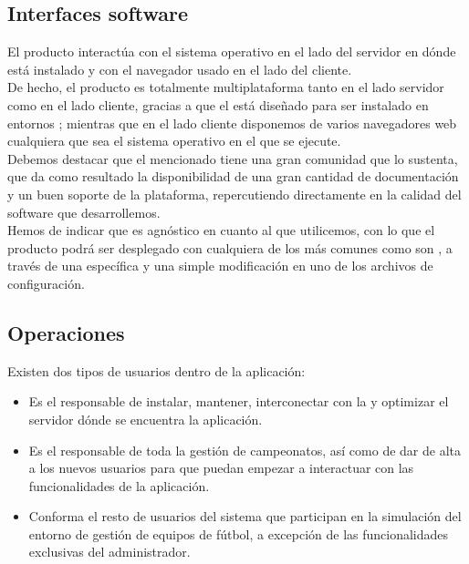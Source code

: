 \subsection{Interfaces software}
El producto interactúa con el sistema operativo en el lado del
servidor en dónde está instalado y con el navegador usado en el lado
del cliente.\\

De hecho, el producto es totalmente multiplataforma tanto en el lado
servidor como en el lado cliente, gracias a que el  está diseñado para ser instalado en entornos ; mientras que en el lado cliente disponemos de varios
navegadores web cualquiera que sea el sistema operativo en el que se
ejecute.\\

Debemos destacar que el mencionado  tiene una gran
comunidad que lo sustenta, que da como resultado la  disponibilidad
de una gran cantidad de documentación y un buen soporte de la plataforma,
repercutiendo directamente en la calidad del software que desarrollemos.\\

Hemos de indicar que  es agnóstico en cuanto al
 que utilicemos, con lo que el producto podrá ser
desplegado con  cualquiera de los  más comunes como son
, a través de una
 específica y una simple modificación en uno de los
archivos de configuración.

\subsection{Operaciones}
Existen dos tipos de usuarios dentro de la aplicación:

\begin{itemize}
  \item {} Es el responsable de instalar,
    mantener, interconectar con la  y optimizar
    el servidor dónde se encuentra la aplicación.
  \item {} Es el responsable de toda la gestión
   de campeonatos, así como de dar de alta a los nuevos usuarios
   para que puedan empezar a interactuar con las funcionalidades de la
   aplicación.
  \item {} Conforma el resto de usuarios del sistema
    que participan en la simulación del entorno de gestión de equipos
    de fútbol, a excepción de las funcionalidades exclusivas del administrador.
\end{itemize}


